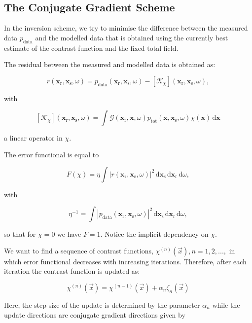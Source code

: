 \documentclass[10pt,a4paper]{article}
\newcommand{\df}[1]{\, \ensuremath{\mbox{d}#1}}
\newcommand{\xs}{\mathbf{x}_\text{s}}
\newcommand{\xr}{\mathbf{x}_\text{r}}
\newcommand{\x}{\mathbf{x}}
\begin{document}
\subsection{The Conjugate Gradient Scheme}

In the inversion scheme, we try to minimise the difference between the measured data $p_\text{data}$ and the modelled data that is obtained using the currently best estimate of the contrast function and the fixed total field. 

The residual between the measured and modelled data is obtained as: 

\begin{equation} \label{eq:eq9} r(\xr, \xs, \omega) = p_{\text{data}}(\xr, \xs, \omega) - \left[\mathcal{K}_\chi \right](\xr, \xs, \omega), \end{equation} 

with

\begin{equation} \label{eq:eq10} \left[\mathcal{K}_\chi \right](\xr, \xs, \omega) = \int \mathcal{G}(\xr, \x, \omega) p_\text{tot}(\x, \xs, \omega) \chi(\x) \df{\x} \end{equation} 

a linear operator in $\chi$. 

The error functional is equal to

\begin{equation} \label{eq:eq11} F(\chi) = \eta \int |r(\xr, \xs, \omega)|^2 \df{\mathbf{x}_\text{s}} \df{\xr} \df{\omega},\end{equation} 

with

\begin{equation} \label{eq:eq12} \eta^{-1} = \int | p_\text{data}(\xr, \xs, \omega) |^2 \df{\xs} \df{\xr} \df{\omega}, \end{equation} 

so that for $\chi = 0$ we have $F = 1$. Notice the implicit dependency on $\chi$.

We want to find a sequence of contrast functions, $\chi^{(n)}(\vec{x}), n = 1,2,...,$ in which error functional decreases with increasing iterations. Therefore, after each iteration the contrast function is updated as: 

\begin{equation} \label{eq:eq13} \chi^{(n)}(\vec{x}) =  \chi^{(n-1)}(\vec{x}) + \alpha_n\zeta_n(\vec{x}) \end{equation} 

Here, the step size of the update is determined by the parameter $\alpha_n$ while the update directions are conjugate gradient directions given by
\end{document}
